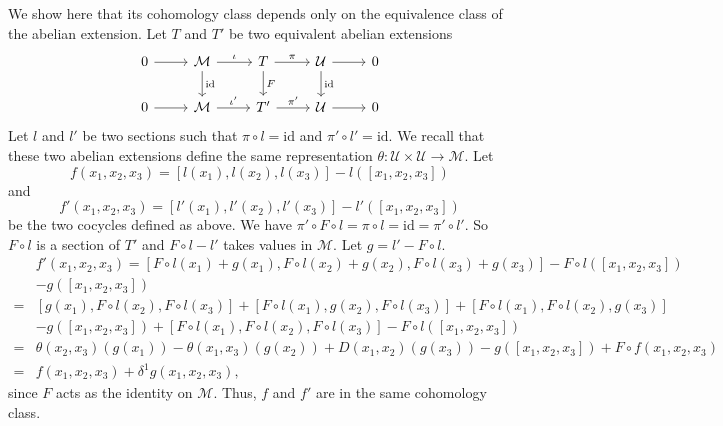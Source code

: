 \documentclass[11pt, twoside]{article}
\begin{document}
 We show here that its cohomology class depends only on the equivalence class of the abelian extension. Let $T$ and $T'$ be two equivalent abelian extensions \[\begin{tikzcd}
	0 & \mathcal{M} & T & {\mathcal{U}} & 0 \\
	0 & \mathcal{M} & {T'} & {\mathcal{U}} & 0
	\arrow[from=1-1, to=1-2]
	\arrow["\iota", from=1-2, to=1-3]
	\arrow["{\mathrm{id}}", from=1-2, to=2-2]
	\arrow["\pi", from=1-3, to=1-4]
	\arrow["F", from=1-3, to=2-3]
	\arrow[from=1-4, to=1-5]
	\arrow["{\mathrm{id}}", from=1-4, to=2-4]
	\arrow[from=2-1, to=2-2]
	\arrow["{\iota'}", from=2-2, to=2-3]
	\arrow["{\pi'}", from=2-3, to=2-4]
	\arrow[from=2-4, to=2-5]
\end{tikzcd}\] Let $l$ and $l'$ be two sections such that $\pi\circ l=\mathrm{id} $ and $\pi'\circ l'=\mathrm{id} $. We recall that these two abelian extensions define the same representation $\theta:\mathcal{U}\times \mathcal{U}\to \mathcal{M}$. Let $$f(x_1,x_2,x_3)=[l(x_1),l(x_2),l(x_3)]-l([x_1,x_2,x_3]) $$ and $$f'(x_1,x_2,x_3)= [l'(x_1),l'(x_2),l'(x_3)]-l'([x_1,x_2,x_3]) $$ be the two cocycles defined as above. We have $\pi'\circ F\circ l= \pi\circ l=\mathrm{id}= \pi'\circ l' $. So $F\circ l$ is a section of $T' $ and $F\circ l -l' $ takes values in $\mathcal{M}$. Let $g= l' -F\circ l  $. \begin{align*}
    &f'(x_1,x_2,x_3)= [F\circ l(x_1)+g(x_1),F\circ l(x_2)+g(x_2),F\circ l(x_3)+g(x_3)]- F\circ l([x_1,x_2,x_3])\\ & - g([x_1,x_2,x_3]) \\ =& [g(x_1),F\circ l(x_2),F\circ l(x_3)]+[F\circ l(x_1),g(x_2),F\circ l(x_3)]+ [F\circ l(x_1),F\circ l(x_2),g(x_3)]\\ &-g([x_1,x_2,x_3]) + [F\circ l(x_1),F\circ l(x_2),F\circ l(x_3)] - F\circ l([x_1,x_2,x_3])\\ =& \theta(x_2,x_3)(g(x_1)) - \theta(x_1,x_3)(g(x_2)) + D(x_1,x_2)(g(x_3)) - g([x_1,x_2,x_3]) + F\circ f(x_1,x_2,x_3)\\ =& f(x_1,x_2,x_3)+ \delta^1 g(x_1,x_2,x_3),
\end{align*} since $F $ acts as the identity on $\mathcal{M}$. Thus, $f$ and $f'$ are in the same cohomology class.
\end{document}
